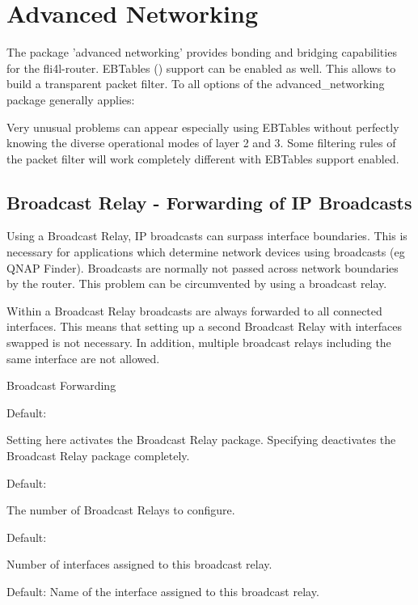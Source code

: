 {
\section {Advanced Networking}
}

The package 'advanced networking' provides bonding and bridging 
capabilities for the fli4l-router.
EBTables () support
can be enabled as well. This allows to build a transparent 
packet filter. To all options of the advanced\_networking 
package generally applies:
\smallskip


Very unusual problems can appear especially using EBTables
without perfectly knowing the diverse operational modes of layer
2 and 3. Some filtering rules of the packet filter will work 
completely different with EBTables support enabled.

\subsection{Broadcast Relay - Forwarding of IP Broadcasts}

Using a Broadcast Relay, IP broadcasts can surpass interface boundaries.
This is necessary for applications which determine network devices
using broadcasts (eg QNAP Finder). Broadcasts are normally not passed
across network boundaries by the router. This problem can be circumvented
by using a broadcast relay.

Within a Broadcast Relay broadcasts are always forwarded to all connected
interfaces. This means that setting up a second Broadcast Relay with interfaces
swapped is not necessary. In addition, multiple broadcast relays including the same
interface are not allowed.

\begin{description}

 Broadcast Forwarding

  Default: 

  Setting  here activates the Broadcast Relay package. Specifying
   deactivates the Broadcast Relay package completely.


  Default: 

  The number of Broadcast Relays to configure.


  Default: 

  Number of interfaces assigned to this broadcast relay.


  Default: 
  Name of the interface assigned to this broadcast relay.

\end{description}

